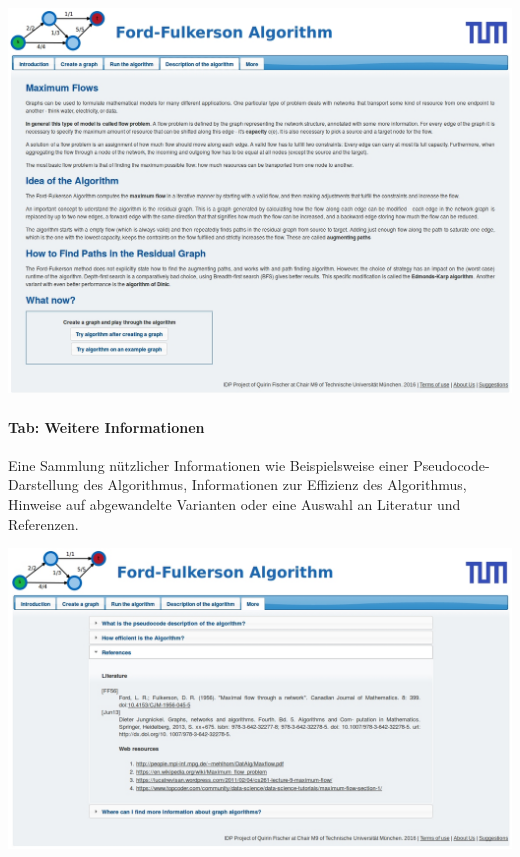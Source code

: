 \begin{center}
\begin{minipage}[t]{0.60\textwidth}
    \includegraphics[width=\textwidth]{img/layout-4.jpg}
\end{minipage}
\end{center}
\vspace{1cm}

\paragraph{Tab: Weitere Informationen}

Eine Sammlung nützlicher Informationen wie Beispielsweise einer Pseudocode-Darstellung des Algorithmus, Informationen zur Effizienz des Algorithmus, Hinweise auf abgewandelte Varianten oder eine Auswahl an Literatur und Referenzen.

\begin{center}
\begin{minipage}[t]{0.60\textwidth}
    \includegraphics[width=\textwidth]{img/layout-5.jpg}
\end{minipage}
\end{center}


